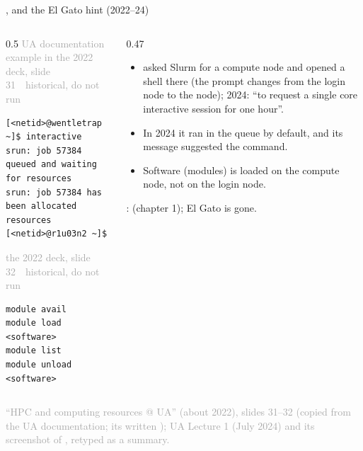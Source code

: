 \documentclass[aspectratio=169,11pt]{beamer}
\newcommand{\sourcecredit}[1]{\vfill\begin{flushright}\tiny\textcolor{DarkGray}{#1}\end{flushright}}
\newcommand{\hist}[1]{{\tiny\sffamily\textcolor{DarkGray}{#1\ \textbullet\ historical, do not run}}\par\nointerlineskip\vspace{0.3mm}}
\begin{document}
\begin{frame}[fragile]{, and the El Gato hint (2022--24)}
\label{fr:interactive}
\begin{columns}[T,onlytextwidth]
\begin{column}{0.5\textwidth}
\hist{UA documentation example in the 2022 deck, slide 31}
\begin{lstlisting}[style=hist]
[<netid>@wentletrap ~]$ interactive
srun: job 57384 queued and waiting for resources
srun: job 57384 has been allocated resources
[<netid>@r1u03n2 ~]$
\end{lstlisting}
\hist{the 2022 deck, slide 32}
\begin{lstlisting}[style=hist]
module avail
module load <software>
module list
module unload <software>
\end{lstlisting}
\end{column}
\begin{column}{0.47\textwidth}
\footnotesize
\begin{itemize}\setlength{\itemsep}{2pt}
  \item {} asked Slurm for a compute node and opened a shell there (the prompt changes from the login node to the node); 2024: ``to request a single core interactive session for one hour''.
  \item In 2024 it ran in the  queue by default, and its message suggested the  command.
  \item Software (modules) is loaded on the compute node, not on the login node.
\end{itemize}
\vspace{1mm}
:  (chapter 1); El Gato is gone.
\end{column}
\end{columns}
\sourcecredit{``HPC and computing resources @ UA'' (about 2022), slides 31--32 (copied from the UA documentation; its \code{netid} written \code{<netid>}); UA Lecture 1 (July 2024) and its screenshot of \code{interactive}, retyped as a summary.}
\end{frame}
\end{document}
